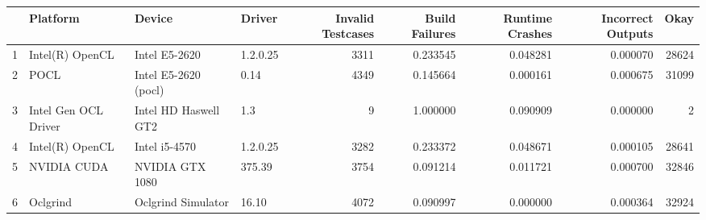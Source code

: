 \begin{tabular}{llllrrrrr}
\toprule
{} &              Platform &                Device &    Driver &  Invalid Testcases &  Build Failures &  Runtime Crashes &  Incorrect Outputs &   Okay \\
\midrule
1 &       Intel(R) OpenCL &         Intel E5-2620 &  1.2.0.25 &               3311 &        0.233545 &         0.048281 &           0.000070 &  28624 \\
2 &                  POCL &  Intel E5-2620 (pocl) &      0.14 &               4349 &        0.145664 &         0.000161 &           0.000675 &  31099 \\
3 &  Intel Gen OCL Driver &  Intel HD Haswell GT2 &       1.3 &                  9 &        1.000000 &         0.090909 &           0.000000 &      2 \\
4 &       Intel(R) OpenCL &         Intel i5-4570 &  1.2.0.25 &               3282 &        0.233372 &         0.048671 &           0.000105 &  28641 \\
5 &           NVIDIA CUDA &       NVIDIA GTX 1080 &    375.39 &               3754 &        0.091214 &         0.011721 &           0.000700 &  32846 \\
6 &              Oclgrind &    Oclgrind Simulator &     16.10 &               4072 &        0.090997 &         0.000000 &           0.000364 &  32924 \\
\bottomrule
\end{tabular}
